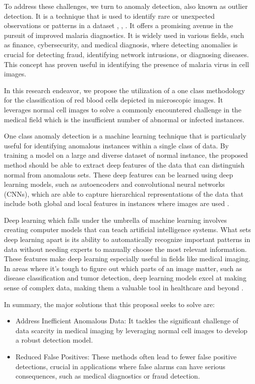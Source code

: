 \documentclass[journal,12pt,onecolumn,draftcls]{IEEEtran}
\begin{document}
To address these challenges, we turn to anomaly detection, also known as outlier detection. It is a technique that is used to identify rare or unexpected observations or patterns in a dataset \cite{chandola2009}, \cite{ruff2021}, \cite{edgeworth1887}. It offers a promising avenue in the pursuit of improved malaria diagnostics. It is widely used in various fields, such as finance, cybersecurity, and medical diagnosis, where detecting anomalies is crucial for detecting fraud, identifying network intrusions, or diagnosing diseases. This concept has proven useful in identifying the presence of malaria virus in cell images.

In this research endeavor, we propose the utilization of a one class methodology for the classification of red blood cells depicted in microscopic images. It leverages normal cell images to solve a commonly encountered challenge in the medical field which is the insufficient number of abnormal or infected instances.

One class anomaly detection is a machine learning technique that is particularly useful for identifying anomalous instances within a single class of data. By training a model on a large and diverse dataset of normal instance, the proposed method should be able to extract deep features of the data that can distinguish normal from anomalous sets. These deep features can be learned using deep learning models, such as autoencoders and convolutional neural networks (CNNs), which are able to capture hierarchical representations of the data that include both global and local features in instances where images are used \cite{torres2021}.

Deep learning which falls under the umbrella of machine learning involves creating computer models that can teach artificial intelligence systems. What sets deep learning apart is its ability to automatically recognize important patterns in data without needing experts to manually choose the most relevant information. These features make deep learning especially useful in fields like medical imaging. In areas where it's tough to figure out which parts of an image matter, such as disease classification and tumor detection, deep learning models excel at making sense of complex data, making them a valuable tool in healthcare and beyond \cite{torres2021}.

In summary, the major solutions that this proposal seeks to solve are:
\begin{itemize}
    \item Address Inefficient Anomalous Data: It tackles the significant challenge of data scarcity in medical imaging by leveraging normal cell images to develop a robust detection model.
    \item Reduced False Positives: These methods often lead to fewer false positive detections, crucial in applications where false alarms can have serious consequences, such as medical diagnostics or fraud detection.
\end{itemize}
\end{document}
